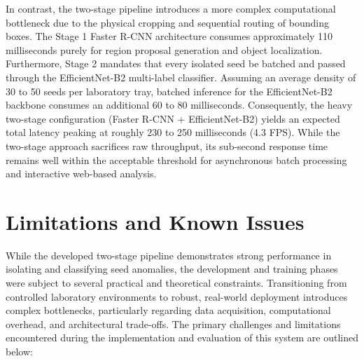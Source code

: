 In contrast, the two-stage pipeline introduces a more complex computational bottleneck due to the physical cropping and sequential routing of bounding boxes. The Stage 1 Faster R-CNN architecture consumes approximately 110 milliseconds purely for region proposal generation and object localization. Furthermore, Stage 2 mandates that every isolated seed be batched and passed through the EfficientNet-B2 multi-label classifier. Assuming an average density of 30 to 50 seeds per laboratory tray, batched inference for the EfficientNet-B2 backbone consumes an additional 60 to 80 milliseconds. Consequently, the heavy two-stage configuration (Faster R-CNN + EfficientNet-B2) yields an expected total latency peaking at roughly 230 to 250 milliseconds (4.3 FPS). While the two-stage approach sacrifices raw throughput, its sub-second response time remains well within the acceptable threshold for asynchronous batch processing and interactive web-based analysis.

\begin{table}[h]
\centering
{}
\caption{Expected system performance and latency estimations evaluated on mid-range GPU hardware. Total latency includes an estimated 50ms overhead for API routing, dynamic image cropping, and PostgreSQL database insertion.}
\label{tab:system_latency}
\end{table}

\section{Limitations and Known Issues}
\label{sec:ch6-limits}

While the developed two-stage pipeline demonstrates strong performance in isolating and classifying seed anomalies, the development and training phases were subject to several practical and theoretical constraints. Transitioning from controlled laboratory environments to robust, real-world deployment introduces complex bottlenecks, particularly regarding data acquisition, computational overhead, and architectural trade-offs. \cite{kamilaris2018deepag} \cite{tobin2017domainrand} The primary challenges and limitations encountered during the implementation and evaluation of this system are outlined below:

